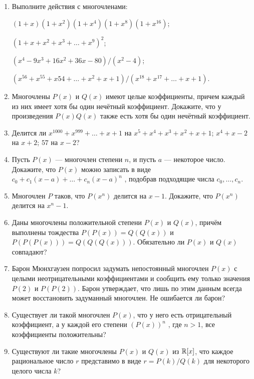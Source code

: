 \begin{enumerate}
\item Выполните действия с многочленами:

\noindent\ipunkt $(1 + x)(1 + x^2)(1 + x^4)(1 + x^8)(1 + x^{16})$;

\noindent\ipunkt $(1 + x + x^2 + x^3 + \dots + x^9)^2$;

\noindent\ipunkt $(x^4 - 9x^3 + 16x^2 + 36x - 80)/(x^2 - 4)$;

\noindent\ipunkt $(x^{56} + x^{55} + x{54} + \dots + x^2 + x + 1)/(x^{18} + x^{17} + \dots + x + 1)$.

\item Многочлены $P(x)$ и $Q(x)$ имеют целые коэффициенты, причем каждый из них имеет хотя бы
один нечётный коэффициент. Докажите, что у произведения $P(x)Q(x)$ также есть хотя бы один нечётный
коэффициент.

\item Делится ли \ipunkt $x^{1000} + x^{999} + \dots + x + 1$ на $x^5 + x^4 + x^3 + x^2 + x + 1$;
\ipunkt $x^4 + x - 2$ на $x + 2$; \ipunkt $57$ на $x - 2$?

\item Пусть $P(x)$ --- многочлен степени $n$, и пусть $a$ --- некоторое число. Докажите, что $P(x)$ можно записать
в виде $c_0 + c_1(x - a) + \dots + c_n (x - a)^n$ , подобрав подходящие числа $c_0, \dots, c_n$.

\item Многочлен $P$ таков, что $P(x^n)$ делится на $x - 1$. Докажите, что $P(x^n)$ делится на $x^n - 1$.

\item Даны многочлены положительной степени $P(x)$ и $Q(x)$, причём выполнены тождества
$P(P(x)) = Q(Q(x))$ и $P(P(P(x))) = Q(Q(Q(x)))$. Обязательно ли $P(x)$ и $Q(x)$ совпадают?

\item Барон Мюнхгаузен попросил задумать непостоянный многочлен $P(x)$ с целыми 
неотрицательными коэффициентами и сообщить ему только значения $P(2)$ и $P(P(2))$. Барон утверждает, что
лишь по этим данным всегда может восстановить задуманный многочлен. Не ошибается ли барон?

\item Существует ли такой многочлен $P(x)$, что у него есть отрицательный коэффициент, а у
каждой его степени $(P(x))^n$ , где $n>1$, все коэффициенты положительны?

\item Существуют ли такие многочлены $P(x)$ и $Q(x)$ из $\mathbb R[x]$, что каждое рациональное число $r$
представимо в виде $r = P(k)/Q(k)$ для некоторого целого числа $k$?


\end{enumerate}













